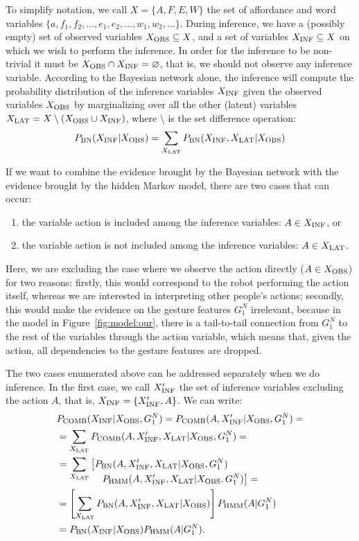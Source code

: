 To simplify notation, we call $X = \{A, F, E, W\}$ the set of affordance and word variables $\{a, f_1, f_2, \dots, e_1, e_2, \dots, w_1, w_2, \dots\}$.
During inference, we have a (possibly empty) set of observed variables $X_\text{OBS} \subseteq X$, and a set of variables $X_\text{INF} \subseteq X$ on which we wish to perform the inference.
In order for the inference to be non-trivial it must be $X_\text{OBS} \cap X_\text{INF} = \varnothing$, that is, we should not observe any inference variable.
According to the Bayesian network alone, the inference will compute the probability distribution of the inference variables $X_\text{INF}$ given the observed variables $X_\text{OBS}$ by marginalizing over all the other (latent) variables $X_\text{LAT} = X \setminus (X_\text{OBS} \cup X_\text{INF})$, where $\setminus$ is the set difference operation:
\begin{eqnarray*}
 P_{\text{BN}}(X_\text{INF}|X_\text{OBS}) = \sum_{X_\text{LAT}} P_{\text{BN}}(X_\text{INF}, X_\text{LAT}| X_\text{OBS})
\end{eqnarray*}

If we want to combine the evidence brought by the Bayesian network with the evidence brought by the hidden Markov model, there are two cases that can occur:
\begin{enumerate}
\item the variable action is included among the inference variables: $A \in X_\text{INF}$, or
\item the variable action is not included among the inference variables: $A \in X_\text{LAT}$.
\end{enumerate}
Here, we are excluding the case where we observe the action directly ($A\in X_\text{OBS}$) for two reasons: firstly, this would correspond to the robot performing the action itself, whereas we are interested in interpreting other people's actions;
secondly, this would make the evidence on the gesture features $G_1^N$ irrelevant, because in the model in Figure~\ref{fig:model:our}, there is a tail-to-tail connection from $G_1^N$ to the rest of the variables through the action variable, which means that, given the action, all dependencies to the gesture features are dropped.

The two cases enumerated above can be addressed separately when we do inference.
In the first case, we call $X_\text{INF}^\prime$ the set of inference variables excluding the action $A$, that is, $X_\text{INF} = \{X_\text{INF}^\prime, A\}$.
We can write:
\begin{align*}
  & P_\text{COMB}(X_\text{INF}| X_\text{OBS}, G_1^N) = P_\text{COMB}(A, X_\text{INF}^\prime| X_\text{OBS}, G_1^N)= \\
  &= \sum_{X_\text{LAT}} P_\text{COMB}(A, X_\text{INF}^\prime, X_\text{LAT}| X_\text{OBS}, G_1^N)=\\
  &= \sum_{X_\text{LAT}} \left[P_{\text{BN}}(A, X_\text{INF}^\prime, X_\text{LAT}| X_\text{OBS}, G_1^N)\right. \\[-4mm]
    & \mspace{80mu} \left.P_{\text{HMM}}(A, X_\text{INF}^\prime, X_\text{LAT}| X_\text{OBS}, G_1^N)\right]= \\
  &= \left[\sum_{X_\text{LAT}} P_{\text{BN}}(A, X_\text{INF}^\prime, X_\text{LAT}| X_\text{OBS})\right] P_{\text{HMM}}(A | G_1^N) \\
  &= P_{\text{BN}}(X_\text{INF}| X_\text{OBS}) P_{\text{HMM}}(A | G_1^N).
\end{align*}

